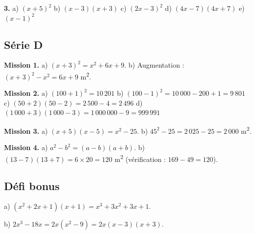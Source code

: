 \documentclass[../main.tex]{subfiles}
\begin{document}
\textbf{3.} a) $(x + 5)^2$ \quad b) $(x - 3)(x + 3)$ \quad c) $(2x - 3)^2$ \quad d) $(4x - 7)(4x + 7)$ \quad e) $(x - 1)^2$

\subsection*{Série D}

\textbf{Mission 1.}
a) $(x+3)^2 = x^2 + 6x + 9$.
b) Augmentation : $(x+3)^2 - x^2 = 6x + 9$ m\textsuperscript{2}.

\textbf{Mission 2.}
a) $(100+1)^2 = 10\,201$ \quad
b) $(100-1)^2 = 10\,000 - 200 + 1 = 9\,801$ \quad
c) $(50+2)(50-2) = 2\,500 - 4 = 2\,496$ \quad
d) $(1\,000+3)(1\,000-3) = 1\,000\,000 - 9 = 999\,991$

\textbf{Mission 3.}
a) $(x+5)(x-5) = x^2 - 25$.
b) $45^2 - 25 = 2\,025 - 25 = 2\,000$ m\textsuperscript{2}.

\textbf{Mission 4.}
a) $a^2 - b^2 = (a-b)(a+b)$.
b) $(13-7)(13+7) = 6 \times 20 = 120$ m\textsuperscript{2} (vérification : $169 - 49 = 120$).

\subsection*{Défi bonus}

a) $(x^2 + 2x + 1)(x+1) = x^3 + 3x^2 + 3x + 1$.

b) $2x^3 - 18x = 2x(x^2 - 9) = 2x(x - 3)(x + 3)$.
\end{document}
